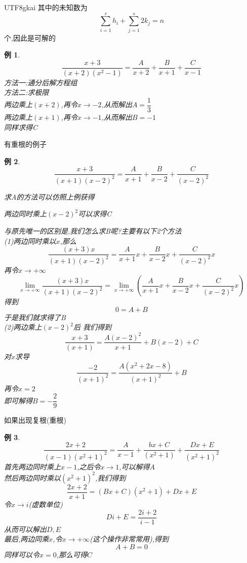 \documentclass{article}
\newtheorem{example}{例}[subsection]
\begin{document}
\begin{CJK}{UTF8}{gkai}
其中的未知数为\[\sum_{i = 1}^r h_i+ \sum_{j = 1}^s 2k_j =n\]个,因此是可解的\\

\begin{example}
  \[\dfrac{x+3}{(x + 2 )(x^2 - 1 )} = \dfrac{A}{x + 2}+\dfrac{B}{x + 1}+\dfrac{C}{x -1}\]
  方法一:通分后解方程组\\

  方法二:求极限\\
  两边乘上$(x + 2)$,再令$x \to -2$,从而解出$A = \dfrac{1}{3}$\\
  两边乘上$(x + 1)$,再令$x \to -1$,从而解出$B = -1$\\
  同样求得C
\end{example}
有重根的例子
\begin{example}
  \[\dfrac{x + 3}{(x + 1) (x - 2)^2} = \dfrac{A}{x + 1} + \dfrac{B}{x-2} + \dfrac{C}{(x-2)^2}\]

求A的方法可以仿照上例获得

两边同时乘上$(x-2)^2$可以求得C

与原先唯一的区别是,我们怎么求B呢?主要有以下2个方法\\

(1)两边同时乘以$x$,那么
\[\dfrac{(x + 3)x}{(x + 1) (x - 2)^2}=\dfrac{A}{x + 1}x + \dfrac{B}{x-2}x + \dfrac{C}{(x-2)^2}x\]
再令$x\to +\infty$
\[\lim_{x\to +\infty}\dfrac{(x + 3)x}{(x + 1) (x - 2)^2}=\lim_{x\to +\infty}\left(\dfrac{A}{x + 1}x + \dfrac{B}{x-2}x + \dfrac{C}{(x-2)^2}x\right)\]
得到
\[ 0 = A + B \]
于是我们就求得了B\\

(2)两边乘上$(x-2)^2$后
我们得到
\[\dfrac{x + 3}{(x + 1)} = \dfrac{A(x - 2)^2}{x + 1} + B(x-2) + C\]
对$x$求导
\[\dfrac{-2}{(x + 1)^2} = \dfrac{A(x^2 + 2x -8)}{(x + 1)^2} + B \]
再令$x = 2$\\
即可解得$B = -\dfrac{2}{9}$
\end{example}
如果出现复根(重根)
\begin{example}
\[\dfrac{2x+2}{(x-1)(x^2 + 1)^2} = \dfrac{A}{x-1} + \dfrac{bx + C}{(x^2 + 1)} +  \dfrac{Dx + E}{(x^2 + 1 )^2} \]
首先两边同时乘上$x-1$,之后令$x\to 1$,可以解得$A$\\

然后两边同时乘以$(x^2 + 1)^2$,我们得到
\[\dfrac{2x+2}{x+1} = (Bx + C)(x^2 + 1) + Dx + E\]
令$x\to i$(虚数单位)\\
\[Di + E = \dfrac{2i + 2}{i - 1}\]
从而可以解出$D,E$\\

最后,两边同乘$x$,令$x\to + \infty$(这个操作非常常用),得到\\
\[A+B = 0\]
同样可以令$x = 0$,那么可得$C$\\
\end{example}

\end{CJK}
\end{document}
